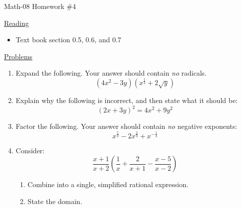 \documentclass[letterpaper,12pt,fleqn]{article}
\begin{document}
\begin{center}
\Large Math-08 Homework \#4
\end{center}

\vspace{0.5in}

\underline{Reading}

\begin{itemize}
\item Text book section 0.5, 0.6, and 0.7
\end{itemize}

\underline{Problems}

\begin{enumerate}
\item Expand the following. Your answer should contain \emph{no} radicals.
  \[(4x^2-3y)(x^{\frac{1}{3}}+2\sqrt{y})\]

\item Explain why the following is incorrect, and then state what it should
  be:
  \[(2x+3y)^2=4x^2+9y^2\]

\item Factor the following. Your answer should contain \emph{no} negative
  exponents:
  \[x^{\frac{5}{3}}-2x^{\frac{2}{3}}+x^{-\frac{1}{3}}\]

\item Consider:
  \[\frac{x+1}{x+2}\left(\frac{1}{x}+\frac{2}{x+1}-\frac{x-5}{x-2}\right)\]
  \begin{enumerate}
    \item Combine into a single, simplified rational expression.
    \item State the domain.
  \end{enumerate}
\end{enumerate}
  
\end{document}

